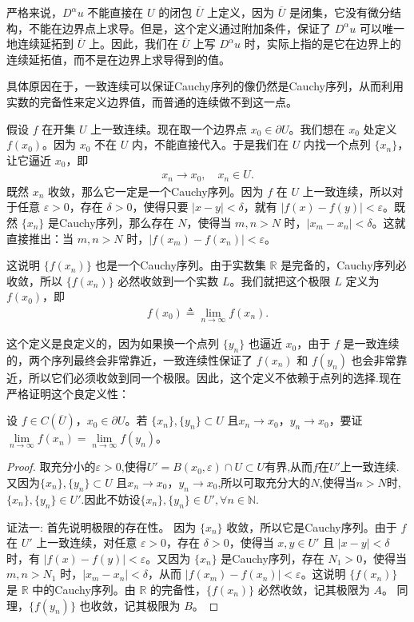 \documentclass[../../main.tex]{subfiles}
\begin{document}
\begin{remark}
严格来说，$D^\alpha u$ 不能直接在 $U$ 的闭包 $\overline{U}$ 上定义，因为 $\overline{U}$ 是闭集，它没有微分结构，不能在边界点上求导。但是，这个定义通过附加条件，保证了 $D^\alpha u$ 可以唯一地连续延拓到 $\overline{U}$ 上。因此，我们在 $\overline{U}$ 上写 $D^\alpha u$ 时，实际上指的是它在边界上的连续延拓值，而不是在边界上求导得到的值。

具体原因在于，一致连续可以保证Cauchy序列的像仍然是Cauchy序列，从而利用实数的完备性来定义边界值，而普通的连续做不到这一点。

假设 $f$ 在开集 $U$ 上一致连续。现在取一个边界点 $x_0 \in \partial U$。我们想在 $x_0$ 处定义 $f(x_0)$。因为 $x_0$ 不在 $U$ 内，不能直接代入。于是我们在 $U$ 内找一个点列 $\{x_n\}$，让它逼近 $x_0$，即
\begin{align*}
x_n \to x_0, \quad x_n \in U.
\end{align*}
既然 $x_n$ 收敛，那么它一定是一个Cauchy序列。因为 $f$ 在 $U$ 上一致连续，所以对于任意 $\varepsilon > 0$，存在 $\delta > 0$，使得只要 $|x - y| < \delta$，就有 $|f(x) - f(y)| < \varepsilon$。既然 $\{x_n\}$ 是Cauchy序列，那么存在 $N$，使得当 $m, n > N$ 时，$|x_m - x_n| < \delta$。这就直接推出：当 $m, n > N$ 时，$|f(x_m) - f(x_n)| < \varepsilon$。

这说明 $\{f(x_n)\}$ 也是一个Cauchy序列。由于实数集 $\mathbb{R}$ 是完备的，Cauchy序列必收敛，所以 $\{f(x_n)\}$ 必然收敛到一个实数 $L$。我们就把这个极限 $L$ 定义为 $f(x_0)$，即
\begin{align*}
f(x_0) \triangleq \lim\limits_{n \to \infty} f(x_n).
\end{align*}

这个定义是良定义的，因为如果换一个点列 $\{y_n\}$ 也逼近 $x_0$，由于 $f$ 是一致连续的，两个序列最终会非常靠近，一致连续性保证了 $f(x_n)$ 和 $f(y_n)$ 也会非常靠近，所以它们必须收敛到同一个极限。因此，这个定义不依赖于点列的选择.现在严格证明这个良定义性：

设 $f\in C(\overline{U})$，$x_0 \in \partial U$。若 $\{x_n\}, \{y_n\} \subset U$ 且$x_n \to x_0$，$y_n \to x_0$，要证$\lim\limits_{n \to \infty} f(x_n) = \lim\limits_{n \to \infty} f(y_n)$。
\begin{proof}
取充分小的$\varepsilon>0$,使得$U'=B(x_0,\varepsilon)\cap U\subset U$有界,从而$f$在$U'$上一致连续.又因为$\{x_n\}, \{y_n\} \subset U$ 且$x_n \to x_0$，$y_n \to x_0$,所以可取充分大的$N$,使得当$n>N$时,$\{x_n\},\{y_n\}\in U'$.因此不妨设$\{x_n\},\{y_n\}\in U',\forall n\in \mathbb{N}$.

{\color{blue}证法一:}
首先说明极限的存在性。
因为 $\{x_n\}$ 收敛，所以它是Cauchy序列。由于 $f$ 在 $U'$ 上一致连续，对任意 $\varepsilon > 0$，存在 $\delta > 0$，使得当 $x, y \in U'$ 且 $|x - y| < \delta$ 时，有 $|f(x) - f(y)| < \varepsilon$。又因为 $\{x_n\}$ 是Cauchy序列，存在 $N_1 > 0$，使得当 $m, n > N_1$ 时，$|x_m - x_n| < \delta$，从而 $|f(x_m) - f(x_n)| < \varepsilon$。这说明 $\{f(x_n)\}$ 是 $\mathbb{R}$ 中的Cauchy序列。由 $\mathbb{R}$ 的完备性，$\{f(x_n)\}$ 必然收敛，记其极限为 $A$。
同理，$\{f(y_n)\}$ 也收敛，记其极限为 $B$。


\end{proof}
\end{remark}
\end{document}
